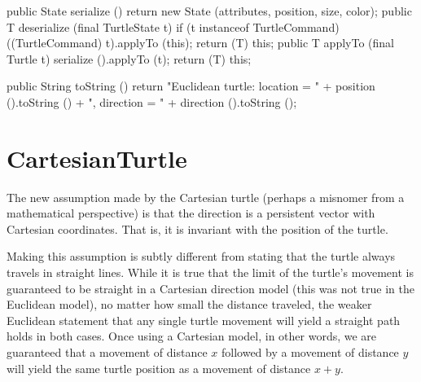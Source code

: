 \documentclass{report}
\begin{document}
\begin{javacode}
{  public State serialize   ()                    {return new State (attributes, position, size, color);}
  public T     deserialize (final TurtleState t) {if (t instanceof TurtleCommand)
                                                    ((TurtleCommand) t).applyTo (this);
                                                  return (T) this;}
  public T applyTo (final Turtle t) {
    serialize ().applyTo (t);
    return (T) this;
  }

  public String toString () {return "Euclidean turtle: location = " + position ().toString () +
                                                   ", direction = " + direction ().toString ();}
}
\end{javacode}

\section {CartesianTurtle} \label{sec:cartesianturtle}
      The new assumption made by the Cartesian turtle (perhaps a misnomer from a mathematical perspective) is that the direction is a persistent vector with
      Cartesian coordinates. That is, it is invariant with the position of the turtle.

      Making this assumption is subtly different from stating that the turtle always travels in straight lines. While it is true that the limit of the turtle's
      movement is guaranteed to be straight in a Cartesian direction model (this was not true in the Euclidean model), no matter how small the distance
      traveled, the weaker Euclidean statement that any single turtle movement will yield a straight path holds in both cases. Once using a Cartesian model, in
      other words, we are guaranteed that a movement of distance $x$ followed by a movement of distance $y$ will yield the same turtle position as a movement of
      distance $x + y$.
\end{document}
